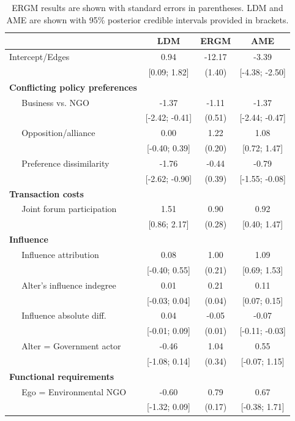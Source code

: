 \documentclass[12pt,pdflatex]{elsarticle}
\begin{document}
\begin{table}[ht]
\centering
\caption{ERGM results are shown with standard errors in parentheses. LDM and AME are shown with 95\% posterior credible intervals provided in brackets.}
\begin{tabular}{lccc}
  & LDM & ERGM & AME \\
  \hline
\hline
Intercept/Edges & 0.94 & -12.17 & -3.39 \\
   & [0.09; 1.82] & (1.40) & [-4.38; -2.50] \\
  \textbf{Conflicting policy preferences}  &  &  &  \\
  $\;\;\;\;$ Business vs. NGO & -1.37 & -1.11 & -1.37 \\
   & [-2.42; -0.41] & (0.51) & [-2.44; -0.47] \\
  $\;\;\;\;$ Opposition/alliance  & 0.00 & 1.22 & 1.08 \\
   & [-0.40; 0.39] & (0.20) & [0.72; 1.47] \\
  $\;\;\;\;$ Preference dissimilarity & -1.76 & -0.44 & -0.79 \\
   & [-2.62; -0.90] & (0.39) & [-1.55; -0.08] \\
  \textbf{Transaction costs}  &  &  &  \\
  $\;\;\;\;$ Joint forum participation & 1.51 & 0.90 & 0.92 \\
   & [0.86; 2.17] & (0.28) & [0.40; 1.47] \\
  \textbf{Influence}  &  &  &  \\
  $\;\;\;\;$ Influence attribution & 0.08 & 1.00 & 1.09 \\
   & [-0.40; 0.55] & (0.21) & [0.69; 1.53] \\
  $\;\;\;\;$ Alter's influence indegree & 0.01 & 0.21 & 0.11 \\
   & [-0.03; 0.04] & (0.04) & [0.07; 0.15] \\
  $\;\;\;\;$ Influence absolute diff. & 0.04 & -0.05 & -0.07 \\
   & [-0.01; 0.09] & (0.01) & [-0.11; -0.03] \\
  $\;\;\;\;$ Alter = Government actor & -0.46 & 1.04 & 0.55 \\
   & [-1.08; 0.14] & (0.34) & [-0.07; 1.15] \\
  \textbf{Functional requirements}  &  &  &  \\
  $\;\;\;\;$ Ego = Environmental NGO & -0.60 & 0.79 & 0.67 \\
  & [-1.32; 0.09] & (0.17) & [-0.38; 1.71] \\

\end{tabular}
\end{table}
\end{document}
